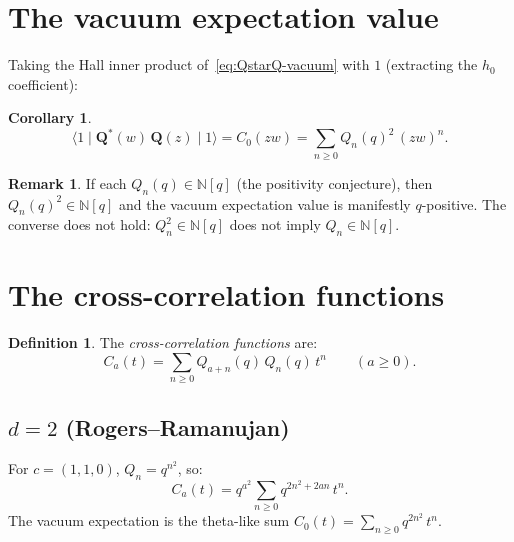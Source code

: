 \documentclass[11pt]{article}
\newcommand{\N}{\mathbb{N}}
\theoremstyle{plain}
\newtheorem{corollary}[theorem]{Corollary}
\theoremstyle{definition}
\newtheorem{definition}[theorem]{Definition}
\newtheorem{remark}[theorem]{Remark}
\begin{document}
\section{The vacuum expectation value}
\label{sec:vev}

Taking the Hall inner product of~\eqref{eq:QstarQ-vacuum} with $1$
(extracting the $h_0$ coefficient):

\begin{corollary}\label{cor:vev}
\begin{equation}\label{eq:vev}
  \langle 1 \mid \mathbf{Q}^*(w)\,\mathbf{Q}(z) \mid 1 \rangle
  = C_0(zw) = \sum_{n \geq 0} Q_n(q)^2\, (zw)^n.
\end{equation}
\end{corollary}

\begin{remark}
If each $Q_n(q) \in \N[q]$ (the positivity conjecture), then
$Q_n(q)^2 \in \N[q]$ and the vacuum expectation value is manifestly
$q$-positive.  The converse does not hold: $Q_n^2 \in \N[q]$ does
not imply $Q_n \in \N[q]$.
\end{remark}


\section{The cross-correlation functions}
\label{sec:cross-corr}

\begin{definition}\label{def:Ca}
The \emph{cross-correlation functions} are:
\begin{equation}\label{eq:Ca}
  C_a(t) = \sum_{n \geq 0} Q_{a+n}(q)\, Q_n(q)\, t^n
  \qquad (a \geq 0).
\end{equation}
\end{definition}

\subsection{$d = 2$ (Rogers--Ramanujan)}

For $c = (1,1,0)$, $Q_n = q^{n^2}$, so:
\begin{equation}\label{eq:Ca-RR}
  C_a(t) = q^{a^2} \sum_{n \geq 0} q^{2n^2 + 2an}\, t^n.
\end{equation}
The vacuum expectation is the theta-like sum
$C_0(t) = \sum_{n \geq 0} q^{2n^2}\, t^n$.
\end{document}
